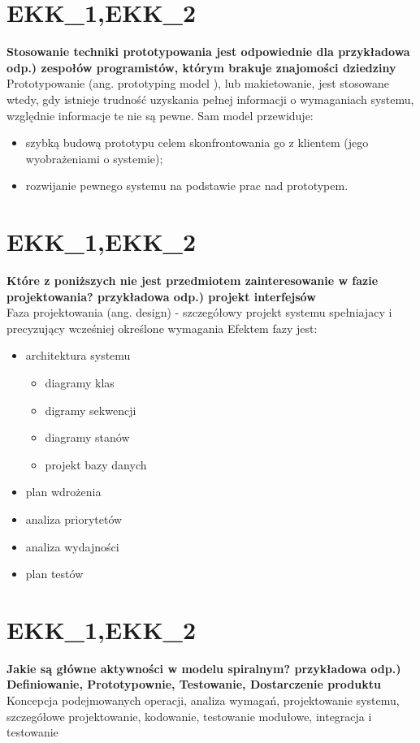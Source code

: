 \section{EKK\_1,EKK\_2}
\textbf{Stosowanie techniki prototypowania jest odpowiednie dla
przykładowa odp.) zespołów programistów, którym brakuje znajomości dziedziny
}\\
Prototypowanie (ang. prototyping model ), lub makietowanie, jest stosowane wtedy, gdy istnieje trudność uzyskania pełnej informacji o wymaganiach systemu, względnie informacje te nie są pewne. Sam model przewiduje:
\begin{itemize}
\item szybką budową prototypu celem skonfrontowania go z klientem (jego wyobrażeniami o systemie);
\item rozwijanie pewnego systemu na podstawie prac nad prototypem.
\end{itemize}

\section{EKK\_1,EKK\_2}
\textbf{Które z poniższych nie jest przedmiotem zainteresowanie w fazie projektowania?
przykładowa odp.) projekt interfejsów}\\
Faza projektowania (ang. design) - szczegółowy projekt systemu spełniajacy i precyzujący wcześniej określone wymagania
Efektem fazy jest:
\begin{itemize}
\item architektura systemu
\begin{itemize}
\item diagramy klas
\item digramy sekwencji
\item diagramy stanów
\item projekt bazy danych
\end{itemize}
\item plan wdrożenia
\item analiza priorytetów
\item analiza wydajności
\item plan testów
\end{itemize}

\section{EKK\_1,EKK\_2}
\textbf{Jakie są główne aktywności w modelu spiralnym?
przykładowa odp.) Definiowanie, Prototypownie, Testowanie, Dostarczenie produktu}\\
Koncepcja podejmowanych operacji, analiza wymagań, projektowanie systemu, szczegółowe projektowanie, kodowanie, testowanie modułowe, integracja i testowanie


